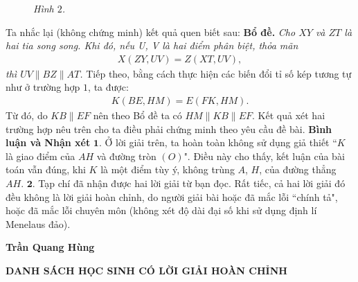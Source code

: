 \begin{multicols}{2}
\begin{figure}[H]
		\caption{\small\textit{\color{thachthuctoanhoc}Hình $2$.}}
		\vspace*{-10pt}
	\end{figure}
	Ta nhắc lại (không chứng minh) kết quả quen biết sau:
	\vskip 0.05cm
	\textbf{Bổ đề.} \textit{Cho $XY$ và $ZT$ là hai tia song song. Khi đó, nếu U, V là hai điểm phân biệt, thỏa mãn
	\begin{align*}
		X(ZY, UV) = Z(XT, UV),
	\end{align*}
	thì $UV \parallel BZ \parallel AT$.}
	\vskip 0.05cm
	Tiếp theo, bằng cách thực hiện các biến đổi tỉ số kép tương tự như ở trường hợp $1$, ta được:
	\begin{align*}
		K\left( {BE,HM} \right) = E\left( {FK,HM} \right).
	\end{align*}
	Từ đó, do $KB \parallel EF$ nên theo Bổ đề ta có $HM \parallel KB \parallel EF$.
	\vskip 0.05cm
	Kết quả xét hai trường hợp nêu trên cho ta điều phải chứng minh theo yêu cầu đề bài.
	\vskip 0.05cm
	\textbf{\color{thachthuctoanhoc}Bình luận và Nhận xét}
	\vskip 0.05cm
	$\pmb{1.}$ Ở lời giải trên, ta hoàn toàn không sử dụng giả thiết ``$K$ là giao điểm của $AH$ và đường tròn $(O)$". Điều này cho thấy, kết luận của bài toán vẫn đúng, khi $K$ là một điểm tùy ý, không trùng $A$, $H$, của đường thẳng $AH.$
	\vskip 0.05cm
	$\pmb{2.}$ Tạp chí đã nhận được hai lời giải từ bạn đọc. Rất tiếc, cả hai lời giải đó đều không là lời giải hoàn chỉnh, do người giải bài hoặc đã mắc lỗi ``chính tả", hoặc đã mắc lỗi chuyên môn (không xét độ dài đại số khi sử dụng định lí Menelaus đảo).
	\begin{flushright}
	\textbf{\color{thachthuctoanhoc}
			Trần Quang Hùng}
	\end{flushright}
\end{multicols}
\begin{center}
	\textbf{\color{thachthuctoanhoc}DANH SÁCH HỌC SINH CÓ LỜI GIẢI HOÀN CHỈNH}
\end{center}

